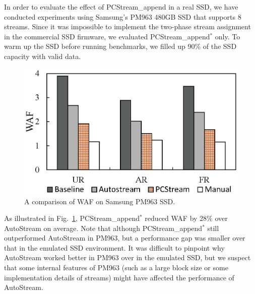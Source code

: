 In order to evaluate the effect of \textsf{\small PCStream\_append} in a real SSD,  
we have
conducted experiments using Samsung's PM963 480GB SSD that supports 8 streams.
Since it was impossible to implement the two-phase stream assignment in the
commercial SSD firmware, we evaluated \textsf{\small PCStream\_append$^*$} only.  To warm up the
SSD before running benchmarks, we filled up 90\% of the SSD capacity with valid
data.

\begin{figure}[t]
	\centering
	\includegraphics[scale=0.6]{figure/pcstream_/result_ssd}
	\caption{A comparison of WAF on Samsung PM963 SSD.}
	\label{fig:result_ssd}
\end{figure}


As illustrated in Fig.~\ref{fig:result_ssd}, \textsf{\small PCStream\_append$^*$} reduced WAF by
28\% over \textsf{\small AutoStream} on average.  
Note that although \textsf{\small PCStream\_append$^*$} still outperformed \textsf{\small AutoStream} in PM963, 
but a performance gap was smaller over that
in the emulated SSD environment.  It was difficult to pinpoint why
\textsf{\small AutoStream} worked better in PM963 over in the emulated SSD, but we
suspect that some internal features of PM963 (such as a large block size or some implementation details of streams) %
might have affected the performance of \textsf{\small AutoStream}.


